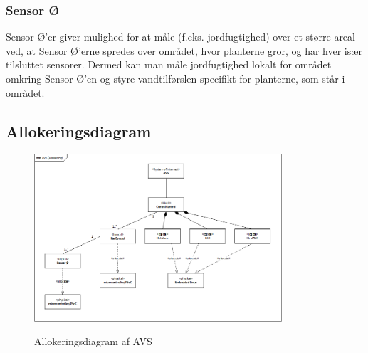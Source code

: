 \subsubsection{Sensor Ø}
Sensor Ø’er giver mulighed for at måle (f.eks. jordfugtighed) over et større areal ved, at Sensor Ø’erne spredes over området, hvor planterne gror, og har hver især tilsluttet sensorer. Dermed kan man måle jordfugtighed lokalt for området omkring Sensor Ø’en og styre vandtilførslen specifikt for planterne, som står i området.
\subsection{Allokeringsdiagram}

\begin{figure}[H]
	\centering
	\includegraphics[width=0.82\textwidth]{Systemarkitektur/System/AVS_Allokeringsdiagram.png}
	\label{fig:System BDD}
	\caption{Allokeringsdiagram af AVS}
\end{figure}







